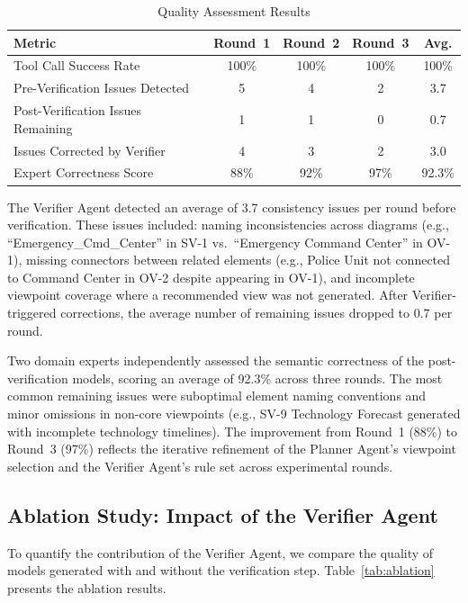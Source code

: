 \documentclass{ieeeaccess}
\begin{document}
\begin{table}[h]
\centering
\caption{Quality Assessment Results}
\label{tab:quality}
\begin{tabular}{lcccc}
\toprule
\textbf{Metric} & \textbf{Round~1} & \textbf{Round~2} & \textbf{Round~3} & \textbf{Avg.} \\
\midrule
Tool Call Success Rate & 100\% & 100\% & 100\% & 100\% \\
Pre-Verification Issues Detected & 5 & 4 & 2 & 3.7 \\
Post-Verification Issues Remaining & 1 & 1 & 0 & 0.7 \\
Issues Corrected by Verifier & 4 & 3 & 2 & 3.0 \\
Expert Correctness Score & 88\% & 92\% & 97\% & 92.3\% \\
\bottomrule
\end{tabular}
\end{table}

The Verifier Agent detected an average of 3.7 consistency issues per round before verification. These issues included: naming inconsistencies across diagrams (e.g., ``Emergency\_Cmd\_Center'' in SV-1 vs.\ ``Emergency Command Center'' in OV-1), missing connectors between related elements (e.g., Police Unit not connected to Command Center in OV-2 despite appearing in OV-1), and incomplete viewpoint coverage where a recommended view was not generated. After Verifier-triggered corrections, the average number of remaining issues dropped to 0.7 per round.

Two domain experts independently assessed the semantic correctness of the post-verification models, scoring an average of 92.3\% across three rounds. The most common remaining issues were suboptimal element naming conventions and minor omissions in non-core viewpoints (e.g., SV-9 Technology Forecast generated with incomplete technology timelines). The improvement from Round~1 (88\%) to Round~3 (97\%) reflects the iterative refinement of the Planner Agent's viewpoint selection and the Verifier Agent's rule set across experimental rounds.

\subsection{Ablation Study: Impact of the Verifier Agent}
\label{sec:ablation}

To quantify the contribution of the Verifier Agent, we compare the quality of models generated with and without the verification step. Table~\ref{tab:ablation} presents the ablation results.
\end{document}
